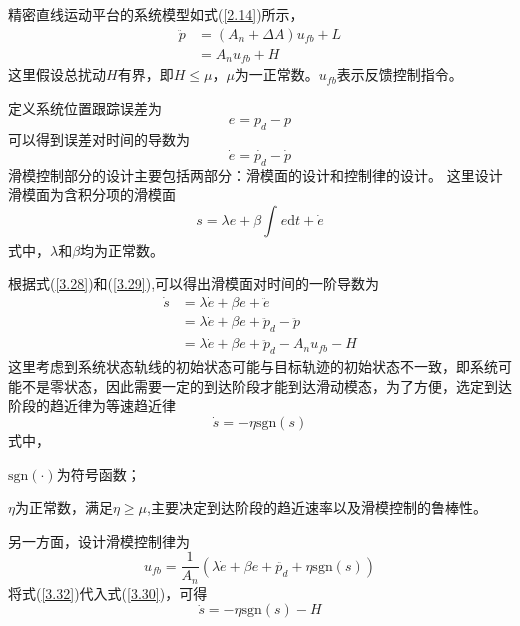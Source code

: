 精密直线运动平台的系统模型如式(\ref{2.14})所示，
$$
\begin{aligned}
\ddot{p}&=({{A}_{n}}+\Delta A)u_{fb}+L \\
&={A}_{n}u_{fb}+H  
\end{aligned}
$$
这里假设总扰动$H$有界，即$H\le\mu$，$\mu$为一正常数。$u_{fb}$表示反馈控制指令。

定义系统位置跟踪误差为
\begin{equation}
\label{3.27}
e=p_d-p
\end{equation}
可以得到误差对时间的导数为
\begin{equation}
\label{3.28}
\dot{e}=\dot{p_d}-\dot{p}
\end{equation}
滑模控制部分的设计主要包括两部分：滑模面的设计和控制律的设计。
这里设计滑模面为含积分项的滑模面
\begin{equation}
\label{3.29}
s=\lambda e+\beta\int_{}^{}e\text{d}t+\dot{e}
\end{equation}
式中，$\lambda$和$\beta$均为正常数。

根据式(\ref{3.28})和(\ref{3.29}),可以得出滑模面对时间的一阶导数为
\begin{equation}
\label{3.30}
\begin{aligned}
\dot{s}&=\lambda \dot{e}+\beta e+\ddot{e} \\ 
&=\lambda\dot{e}+\beta e+{{{\ddot{p}}}_{d}}-\ddot{p} \\ 
&=\lambda \dot{e}+\beta e+{{{\ddot{p}}}_{d}}-{{A}_{n}}u_{fb}-H  
\end{aligned}
\end{equation}
这里考虑到系统状态轨线的初始状态可能与目标轨迹的初始状态不一致，即系统可能不是零状态，因此需要一定的到达阶段才能到达滑动模态，为了方便，选定到达阶段的趋近律为等速趋近律
\begin{equation}
\label{3.31}
\dot{s}=-\eta\text{sgn}(s)
\end{equation}
式中，

$\text{sgn}(\cdot)$为符号函数；

$\eta$为正常数，满足$\eta\ge\mu$,主要决定到达阶段的趋近速率以及滑模控制的鲁棒性。

另一方面，设计滑模控制律为
\begin{equation}
\label{3.32}
u_{fb}=\frac{1}{A_n}\left(\lambda \dot{e}+\beta e+\ddot{p_d}+\eta\text{sgn}(s)\right)
\end{equation}
将式(\ref{3.32})代入式(\ref{3.30})，可得
\begin{equation}
\label{3.33}
\dot{s}=-\eta \text{sgn}(s)-H
\end{equation}


